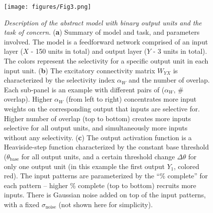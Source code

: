 \begin{figure}[ht]
    \centering
    \texttt{[image: figures/Fig3.png]}
    \caption{
    \textit{Description of the abstract model with binary output units and the task of concern}.
    (\textbf{a}) Summary of model and task, and parameters involved.
    The model is a feedforward network comprised of an input layer ($X$ - 150 units in total)
        and output layer ($Y$ - 3 units in total).
    The colors represent the selectivity for a specific output unit in each input unit.
    (\textbf{b}) The excitatory connectivity matrix $W_{YX}$ is characterized by the selectivity index $\alpha_W$ and the number of overlap.
    Each sub-panel is an example with different pairs of ($\alpha_W$, \# overlap).
        Higher $\alpha_W$ (from left to right) concentrates more input weights on the corresponding output that inputs are selective for.
        Higher number of overlap (top to bottom) creates more inputs selective for all output units, and simultaneously more inputs without any selectivity.
    (\textbf{c})
        The output activation function is a Heaviside-step function characterized by
            the constant base threshold ($\theta_{\mathrm{base}}$ for all output units,
            and a certain threshold change $\Delta\theta$ for only one output unit
            (in this example the first output $Y_1$, colored red).
        The input patterns are parameterized by the ``\% complete'' for each pattern -- higher \% complete (top to bottom) recruits more inputs.
        There is Gaussian noise added on top of the input patterns, with a fixed $\sigma_\mathrm{noise}$ (not shown here for simplicity).
    }
    \label{fig:demo-ffwd-recog}
\end{figure}